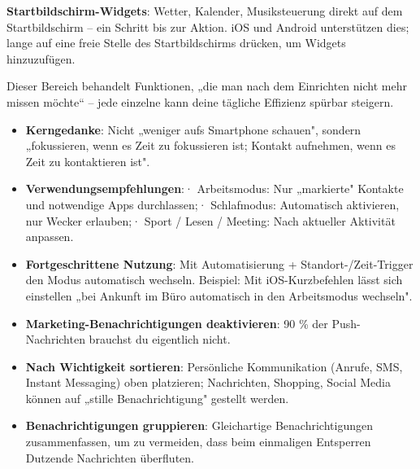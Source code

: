 \textbf{Startbildschirm-Widgets}: Wetter, Kalender, Musiksteuerung direkt auf dem Startbildschirm – ein Schritt bis zur Aktion. iOS und Android unterstützen dies; lange auf eine freie Stelle des Startbildschirms drücken, um Widgets hinzuzufügen.


Dieser Bereich behandelt Funktionen, „die man nach dem Einrichten nicht mehr missen möchte“ – jede einzelne kann deine tägliche Effizienz spürbar steigern.


\begin{itemize}
  \item \textbf{Kerngedanke}: Nicht „weniger aufs Smartphone schauen", sondern „fokussieren, wenn es Zeit zu fokussieren ist; Kontakt aufnehmen, wenn es Zeit zu kontaktieren ist".
  \item \textbf{Verwendungsempfehlungen}:\newline · Arbeitsmodus: Nur „markierte" Kontakte und notwendige Apps durchlassen;\newline · Schlafmodus: Automatisch aktivieren, nur Wecker erlauben;\newline · Sport / Lesen / Meeting: Nach aktueller Aktivität anpassen.
  \item \textbf{Fortgeschrittene Nutzung}: Mit Automatisierung + Standort-/Zeit-Trigger den Modus automatisch wechseln. Beispiel: Mit iOS-Kurzbefehlen lässt sich einstellen „bei Ankunft im Büro automatisch in den Arbeitsmodus wechseln".
\end{itemize}


\begin{itemize}
  \item \textbf{Marketing-Benachrichtigungen deaktivieren}: 90 \% der Push-Nachrichten brauchst du eigentlich nicht.
  \item \textbf{Nach Wichtigkeit sortieren}: Persönliche Kommunikation (Anrufe, SMS, Instant Messaging) oben platzieren; Nachrichten, Shopping, Social Media können auf „stille Benachrichtigung" gestellt werden.
  \item \textbf{Benachrichtigungen gruppieren}: Gleichartige Benachrichtigungen zusammenfassen, um zu vermeiden, dass beim einmaligen Entsperren Dutzende Nachrichten überfluten.
\end{itemize}

